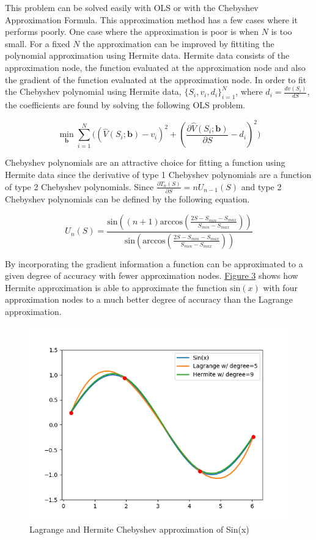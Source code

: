\documentclass[12pt]{article}
\begin{document}
This problem can be solved easily with OLS or with the Chebyshev Approximation Formula. This approximation method has a few cases where it performs poorly. One case where the approximation is poor is when $N$ is too small. For a fixed $N$ the approximation can be improved by fittiting the polynomial approximation using Hermite data. Hermite data consists of the approximation node, the function evaluated at the approximation node and also the gradient of the function evaluated at the approximation node. In order to fit the Chebyshev polynomial using Hermite data, $\{S_i,v_i,d_i\}_{i=1}^N$, where $d_i=\frac{d v(S_i)}{d S}$, the coefficients are found by solving the following OLS problem.

\begin{equation*}
  \min_{\boldsymbol{b}} \sum_{i=1}^N\bigg((\hat{V}(S_i;\boldsymbol{b})-v_i)^2 + (\frac{\partial \hat{V}(S_i;\boldsymbol{b})}{\partial S} - d_i)^2 \bigg)
\end{equation*}

Chebyshev polynomials are an attractive choice for fitting a function using Hermite data since the derivative of type 1 Chebyshev polynomials are a function of type 2 Chebyshev polynomials. Since $\frac{\partial T_n(S)}{\partial S} = n U_{n-1}(S)$ and type 2 Chebyshev polynomials can be defined by the following equation.

\begin{equation*}
  U_n(S) = \frac{\text{sin}((n+1) \text{arccos}(\frac{2S-S_{min}-S_{max}}{S_{min}-S_{max}}))}{\text{sin}(\text{arccos}(\frac{2S-S_{min}-S_{max}}{S_{min}-S_{max}}))}
\end{equation*}

By incorporating the gradient information a function can be approximated to a given degree of accuracy with fewer approximation nodes. \hyperref[ref_Cheb_Sin_Func]{Figure 3} shows how Hermite approximation is able to approximate the function $\text{sin}(x)$ with four approximation nodes to a much better degree of accuracy than the Lagrange approximation.

\begin{figure}[H]
  \centering
  \label{ref_Cheb_Sin_Func}
  \includegraphics[scale=.8]{plot_Cheb_Sin_Func}
  \caption{Lagrange and Hermite Chebyshev approximation of Sin(x)}
\end{figure}
\end{document}
